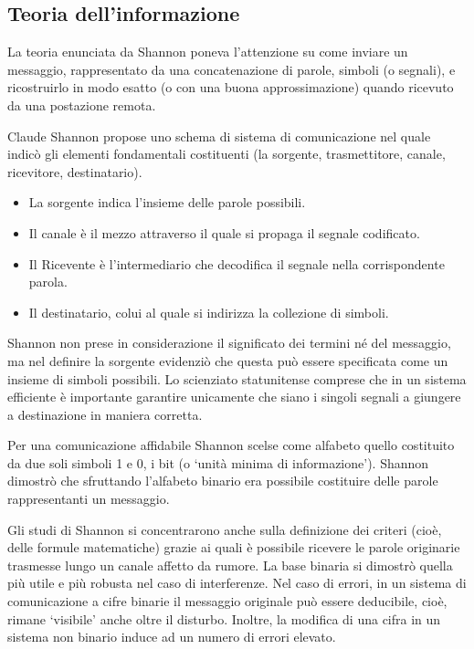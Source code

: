 \documentclass[12pt]{article}
\begin{document}
\subsection{Teoria dell'informazione}
La teoria enunciata da Shannon poneva l’attenzione su come inviare un messaggio, rappresentato da una concatenazione di parole, simboli (o segnali), e ricostruirlo in modo esatto (o con una buona approssimazione) quando ricevuto da una postazione remota.\par\medskip\noindent
Claude Shannon propose uno schema di sistema di comunicazione nel quale indicò gli elementi fondamentali costituenti (la sorgente, trasmettitore, canale, ricevitore, destinatario).
\begin{itemize}
    \item La sorgente indica l’insieme delle parole possibili.
    \item Il canale è il mezzo attraverso il quale si propaga il segnale codificato. 
    \item Il Ricevente è l’intermediario che decodifica il segnale nella corrispondente parola.
    \item Il destinatario, colui al quale si indirizza la collezione di simboli. \par\medskip\noindent 
\end{itemize} 
Shannon non prese in considerazione il significato dei termini né del messaggio, ma nel definire la sorgente evidenziò che questa può essere specificata come un insieme di simboli possibili. Lo scienziato statunitense comprese che in un sistema efficiente è importante garantire unicamente che siano i singoli segnali a giungere a destinazione in maniera corretta.\par\medskip\noindent
Per una comunicazione affidabile Shannon scelse come alfabeto quello costituito da due soli simboli 1 e 0, i bit (o ‘unità minima di informazione’). Shannon dimostrò che sfruttando l’alfabeto binario era possibile costituire delle parole rappresentanti un messaggio.\par\medskip\noindent
Gli studi di Shannon si concentrarono anche sulla definizione dei criteri (cioè, delle formule matematiche) grazie ai quali è possibile ricevere le parole originarie trasmesse lungo un canale affetto da rumore. La base binaria si dimostrò quella più utile e più robusta nel caso di interferenze. Nel caso di errori, in un sistema di comunicazione a cifre binarie il messaggio originale può essere deducibile, cioè, rimane ‘visibile’ anche oltre il disturbo. Inoltre, la modifica di una cifra in un sistema non binario induce ad un numero di errori elevato.\par\medskip\noindent
\end{document}
